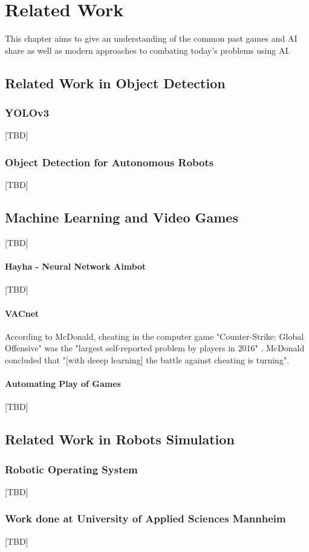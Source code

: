 \chapter{Related Work}
This chapter aims to give an understanding of the common past games and \ac{AI} share as well as modern approaches to combating today's problems using \ac{AI}.

\section{Related Work in Object Detection}
\subsection{YOLOv3}
[TBD]\cite{yolov3}

\subsection{Object Detection for Autonomous Robots}
[TBD]\cite{Schweitzer2017}


\section{Machine Learning and Video Games}
[TBD]
\subsubsection{Hayha - Neural Network Aimbot}
[TBD]\cite{Hayha}

\subsubsection{VACnet}
According to McDonald, cheating in the computer game "Counter-Strike: Global Offensive" was the "largest self-reported problem by players in 2016" \cite{VACnet}. McDonald concluded that "[with deeep learning] the battle against cheating is turning".


\subsubsection{Automating Play of Games}
[TBD]\cite{Tom13thefirst}\cite{Togelius09supermario} %

\section{Related Work in Robots Simulation}

\subsection{Robotic Operating System}
[TBD]\cite{rosSite}

\subsection{Work done at University of Applied Sciences Mannheim}
[TBD]\cite{Seufert2009}

